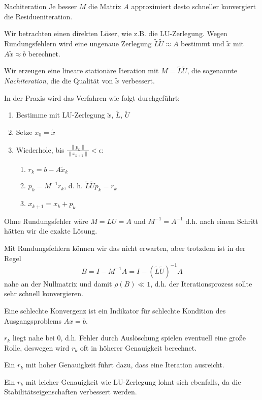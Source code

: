 \begin{defi}{Nachiteration}
    Je besser $M$ die Matrix $A$ approximiert desto schneller konvergiert die Residueniteration.

    Wir betrachten einen direkten Löser, wie z.B. die LU-Zerlegung.
    Wegen Rundungsfehlern wird eine ungenaue Zerlegung $\tilde{L} \tilde{U} \approx A$ bestimmt und $\tilde{x}$ mit $A \tilde{x} \approx b$ berechnet.

    Wir erzeugen eine lineare stationäre Iteration mit $M = \tilde{L} \tilde{U}$, die sogenannte \emph{Nachiteration}, die die Qualität von $\tilde{x}$ verbessert.

    In der Praxis wird das Verfahren wie folgt durchgeführt:
    \begin{enumerate}
        \item Bestimme mit LU-Zerlegung $\tilde{x}$, $\tilde{L}$,  $\tilde{U}$
        \item Setze $x_0 = \tilde{x}$
        \item Wiederhole, bis $\frac{\| p_k \|}{\|x_{k+1} \|} < \epsilon$:
              \begin{enumerate}
                  \item $r_k = b - A \tilde{x}_k$
                  \item $p_k = M^{-1} r_k$, d. h. $\tilde{L} \tilde{U} p_k = r_k$
                  \item $x_{k+1} = x_k + p_k$
              \end{enumerate}
    \end{enumerate}

    Ohne Rundungsfehler wäre $M = LU = A$ und $M^{-1} = A^{-1}$ d.h. nach einem Schritt hätten wir die exakte Lösung.

    Mit Rundungsfehlern können wir das nicht erwarten, aber trotzdem ist in der Regel
    \[
        B = I - M^{-1} A = I - (\tilde{L} \tilde{U})^{-1} A
    \]
    nahe an der Nullmatrix und damit $\rho(B) \ll 1$, d.h. der Iterationsprozess sollte sehr schnell konvergieren.

    Eine schlechte Konvergenz ist ein Indikator für schlechte Kondition des Ausgangsproblems $Ax = b$.

    $r_k$ liegt nahe bei $0$, d.h. Fehler durch Auslöschung spielen eventuell eine große Rolle, deswegen wird $r_k$ oft in höherer Genauigkeit berechnet.

    Ein $r_k$ mit hoher Genauigkeit führt dazu, dass eine Iteration ausreicht.

    Ein $r_k$ mit leicher Genauigkeit wie LU-Zerlegung lohnt sich ebenfalls, da die Stabilitätseigenschaften verbessert werden.
\end{defi}

